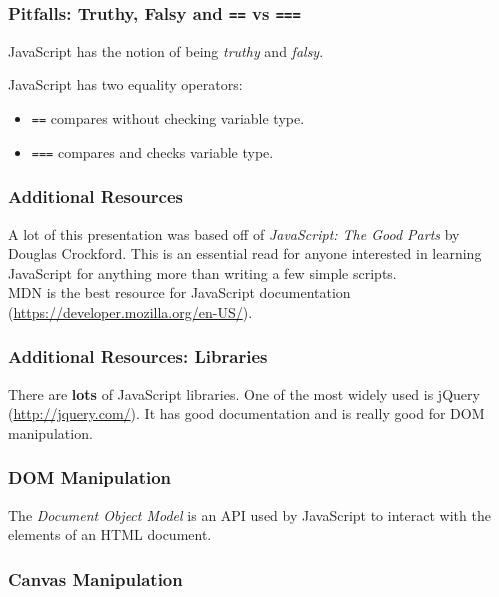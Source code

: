 \documentclass{lug}
\begin{document}
\begin{frame}
    \frametitle{Pitfalls: Truthy, Falsy and \texttt{==} vs \texttt{===}}

    JavaScript has the notion of being \textit{truthy} and \textit{falsy}.

    JavaScript has two equality operators:
    \begin{itemize}
        \item \texttt{==} compares without checking variable type.
        \item \texttt{===} compares and checks variable type.
    \end{itemize}
\end{frame}

\begin{frame}
    \frametitle{Additional Resources}

    A lot of this presentation was based off of \textit{JavaScript: The Good Parts} by Douglas
    Crockford. This is an essential read for anyone interested in learning JavaScript for anything
    more than writing a few simple scripts.\\

    MDN is the best resource for JavaScript documentation
    (\url{https://developer.mozilla.org/en-US/}).
\end{frame}

\begin{frame}
    \frametitle{Additional Resources: Libraries}

    There are \textbf{lots} of JavaScript libraries. One of the most widely used is jQuery
    (\url{http://jquery.com/}). It has good documentation and is really good for DOM
    manipulation.\\

\end{frame}

\begin{frame}
    \frametitle{DOM Manipulation}
    The \textit{Document Object Model} is an API used by JavaScript to interact with the elements of
    an HTML document.\footnotemark[1]


\end{frame}

\begin{frame}
    \frametitle{Canvas Manipulation}

\end{frame}
\end{document}
